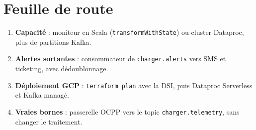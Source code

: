 \documentclass[11pt, a4paper, oneside, headings=normal, numbers=noenddot, DIV=12]{scrartcl}
\begin{document}
\section{Feuille de route}
\begin{enumerate}[leftmargin=1.4em]
  \item \textbf{Capacité} : moniteur en Scala (\texttt{transformWithState}) ou cluster Dataproc, plus de partitions Kafka.
  \item \textbf{Alertes sortantes} : consommateur de \texttt{charger.alerts} vers SMS et ticketing, avec dédoublonnage.
  \item \textbf{Déploiement GCP} : \texttt{terraform plan} avec la DSI, puis Dataproc Serverless et Kafka managé.
  \item \textbf{Vraies bornes} : passerelle OCPP vers le topic \texttt{charger.telemetry}, sans changer le traitement.
\end{enumerate}
\end{document}
